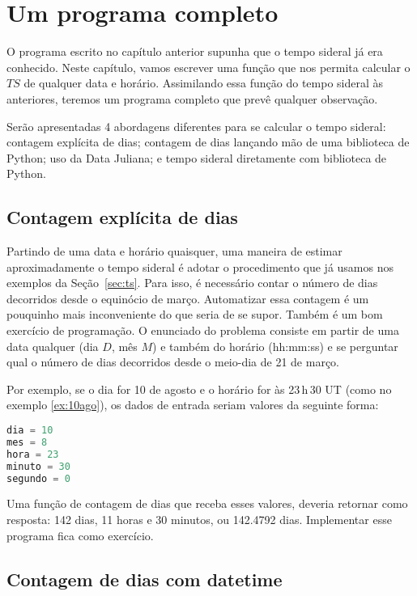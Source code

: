 \chapter{Um programa completo}

O programa escrito no capítulo anterior supunha que o tempo sideral já era conhecido. Neste capítulo, vamos escrever uma função que nos permita calcular o $TS$ de qualquer data e horário. Assimilando essa função do tempo sideral às anteriores, teremos um programa completo que prevê qualquer observação.

Serão apresentadas 4 abordagens diferentes para se calcular o tempo sideral: contagem explícita de dias; contagem de dias lançando mão de uma biblioteca de Python; uso da Data Juliana; e tempo sideral diretamente com biblioteca de Python.

\section{Contagem explícita de dias}
\label{sec:ts1}

Partindo de uma data e horário quaisquer, uma maneira de estimar aproximadamente o tempo sideral é adotar o procedimento que já usamos nos exemplos da Seção~\ref{sec:ts}. Para isso, é necessário contar o número de dias decorridos desde o equinócio de março. Automatizar essa contagem é um pouquinho mais inconveniente do que seria de se supor. Também é um bom exercício de programação. O enunciado do problema consiste em partir de uma data qualquer (dia $D$, mês $M$) e também do horário (hh:mm:ss) e se perguntar qual o número de dias decorridos desde o meio-dia de 21 de março.

Por exemplo, se o dia for 10 de agosto e o horário for às 23\,h\,30 UT (como no exemplo \ref{ex:10ago}), os dados de entrada seriam valores da seguinte forma:

\begin{lstlisting}[language=Python]
dia = 10
mes = 8
hora = 23
minuto = 30
segundo = 0
\end{lstlisting}

\noindent Uma função de contagem de dias que receba esses valores, deveria retornar como resposta: 142 dias, 11 horas e 30 minutos, ou 142.4792 dias. Implementar esse programa fica como exercício.

\section{Contagem de dias com datetime}
\label{sec:ts2}

